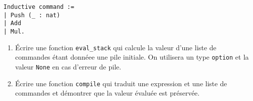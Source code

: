 \documentclass{article}
\begin{document}
\begin{verbatim}
Inductive command :=
| Push (_ : nat)
| Add
| Mul.
\end{verbatim}

\begin{enumerate}[resume]
\item Écrire une fonction \texttt{eval_stack} qui calcule la valeur d'une liste de commandes étant donnéee une pile initiale. On utilisera un type \texttt{option} et la valeur \texttt{None} en cas d'erreur de pile.

\item Écrire une fonction \texttt{compile} qui traduit une expression et une liste de commandes et démontrer que la valeur évaluée est préservée.
\end{enumerate}
\end{document}

